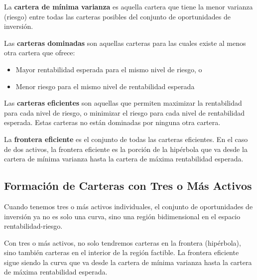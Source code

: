 \begin{definicion}
La \textbf{cartera de mínima varianza} es aquella cartera que tiene la menor varianza (riesgo) entre todas las carteras posibles del conjunto de oportunidades de inversión.
\end{definicion}

\begin{definicion}
Las \textbf{carteras dominadas} son aquellas carteras para las cuales existe al menos otra cartera que ofrece:
\begin{itemize}
\item Mayor rentabilidad esperada para el mismo nivel de riesgo, o
\item Menor riesgo para el mismo nivel de rentabilidad esperada
\end{itemize}
\end{definicion}

\begin{definicion}
Las \textbf{carteras eficientes} son aquellas que permiten maximizar la rentabilidad para cada nivel de riesgo, o minimizar el riesgo para cada nivel de rentabilidad esperada. Estas carteras no están dominadas por ninguna otra cartera.
\end{definicion}

\begin{definicion}
La \textbf{frontera eficiente} es el conjunto de todas las carteras eficientes. En el caso de dos activos, la frontera eficiente es la porción de la hipérbola que va desde la cartera de mínima varianza hasta la cartera de máxima rentabilidad esperada.
\end{definicion}

\subsection{Formación de Carteras con Tres o Más Activos}

Cuando tenemos tres o más activos individuales, el conjunto de oportunidades de inversión ya no es solo una curva, sino una región bidimensional en el espacio rentabilidad-riesgo.

\begin{proposicion}
Con tres o más activos, no solo tendremos carteras en la frontera (hipérbola), sino también carteras en el interior de la región factible. La frontera eficiente sigue siendo la curva que va desde la cartera de mínima varianza hasta la cartera de máxima rentabilidad esperada.
\end{proposicion}

